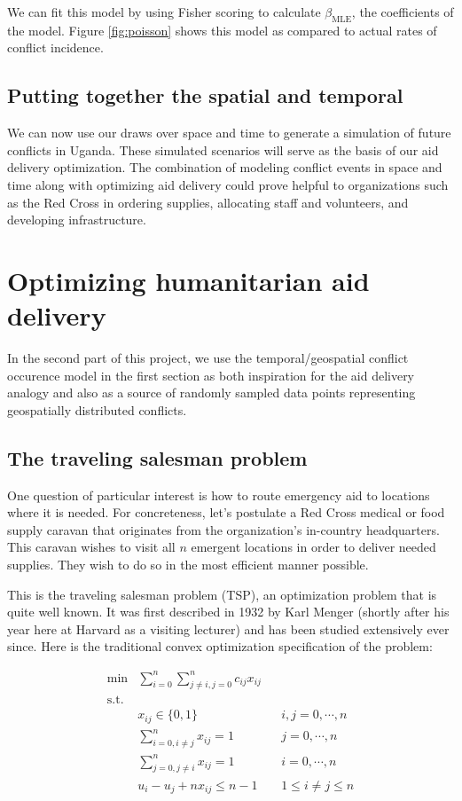 \documentclass{article} %
\begin{document}
We can fit this model by using Fisher scoring to calculate $\beta_\mathrm{MLE}$, the coefficients of the model. Figure \ref{fig:poisson} shows this model as compared to actual rates of conflict incidence.


\subsection{Putting together the spatial and temporal}

We can now use our draws over space and time to generate a simulation of future conflicts in Uganda. These simulated scenarios will serve as the basis of our aid delivery optimization. The combination of modeling conflict events in space and time along with optimizing aid delivery could prove helpful to organizations such as the Red Cross in ordering supplies, allocating staff and volunteers, and developing infrastructure.

\section{Optimizing humanitarian aid delivery}

In the second part of this project, we use the temporal/geospatial conflict occurence model in the first section as both inspiration for the aid delivery analogy and also as a source of randomly sampled data points representing geospatially distributed conflicts.

\subsection{The traveling salesman problem}

One question of particular interest is how to route emergency aid
to locations where it is needed.  For concreteness, let's postulate a Red Cross medical or food supply caravan that originates from the organization's in-country headquarters. This caravan wishes to visit all $n$ emergent locations in order to
deliver needed supplies. They wish to do so in the most efficient manner possible.

This is the traveling salesman problem (TSP), an optimization problem that is quite well known. It was first described in 1932 by Karl Menger (shortly after his year here at Harvard as a visiting lecturer) and has been studied extensively ever since.\cite{Menger} Here is the traditional convex optimization specification of the problem:\cite{Winston}


\begin{align*}
\min &\sum_{i=0}^n \sum_{j\ne i,j=0}^nc_{ij}x_{ij} &&  \\
\mathrm{s.t.} & \\
	& x_{ij} \in \{0, 1\} && i,j=0, \cdots, n \\
	& \sum_{i=0,i\ne j}^n x_{ij} = 1 && j=0, \cdots, n \\
	& \sum_{j=0,j\ne i}^n x_{ij} = 1 && i=0, \cdots, n \\
	&u_i-u_j +nx_{ij} \le n-1 && 1 \le i \ne j \le n
\end{align*}
\end{document}
